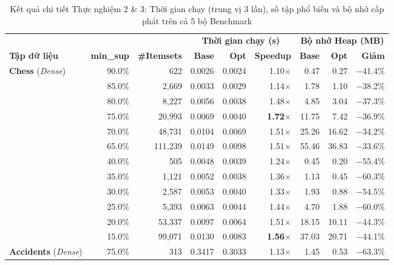 \documentclass[conference]{IEEEtran}
\begin{document}
\begin{table}[t]
\caption{Kết quả chi tiết Thực nghiệm 2 \& 3: Thời gian chạy (trung vị 3 lần), số tập phổ biến và bộ nhớ cấp phát trên cả 5 bộ Benchmark}
\label{tab:exp2_full}
\centering
\scriptsize
\renewcommand{\arraystretch}{0.96}
\setlength{\aboverulesep}{0pt}
\setlength{\belowrulesep}{0pt}
\begin{tabular*}{\textwidth}{@{\extracolsep{\fill}}lrrrrrrrr@{}}
\toprule
& & & \multicolumn{3}{c}{\textbf{Thời gian chạy (s)}} & \multicolumn{3}{c}{\textbf{Bộ nhớ Heap (MB)}} \\
\cmidrule(lr){4-6} \cmidrule(lr){7-9}
\textbf{Tập dữ liệu} & \textbf{min\_sup} & \textbf{\#Itemsets} & \textbf{Base} & \textbf{Opt} & \textbf{Speedup} & \textbf{Base} & \textbf{Opt} & \textbf{Giảm} \\
\midrule
\multirow{6}{*}{\textbf{Chess} (\textit{Dense})}
 & 90.0\% & 622 & 0.0026 & 0.0024 & 1.10$\times$ & 0.47 & 0.27 & $-$41.4\% \\
 & 85.0\% & 2,669 & 0.0033 & 0.0029 & 1.14$\times$ & 1.78 & 1.10 & $-$38.2\% \\
 & 80.0\% & 8,227 & 0.0056 & 0.0038 & 1.48$\times$ & 4.85 & 3.04 & $-$37.3\% \\
 & 75.0\% & 20,993 & 0.0069 & 0.0040 & \textbf{1.72$\times$} & 11.75 & 7.42 & $-$36.9\% \\
 & 70.0\% & 48,731 & 0.0104 & 0.0069 & 1.51$\times$ & 25.26 & 16.62 & $-$34.2\% \\
 & 65.0\% & 111,239 & 0.0149 & 0.0098 & 1.51$\times$ & 55.46 & 36.83 & $-$33.6\% \\
\midrule
\rowcolor{gray!7} & 40.0\% & 505 & 0.0048 & 0.0039 & 1.24$\times$ & 0.45 & 0.20 & $-$55.4\% \\
\rowcolor{gray!7} & 35.0\% & 1,121 & 0.0052 & 0.0038 & 1.36$\times$ & 1.13 & 0.45 & $-$60.3\% \\
\rowcolor{gray!7} & 30.0\% & 2,587 & 0.0053 & 0.0040 & 1.33$\times$ & 1.93 & 0.88 & $-$54.5\% \\
\rowcolor{gray!7} & 25.0\% & 5,393 & 0.0063 & 0.0044 & 1.44$\times$ & 4.70 & 1.88 & $-$60.0\% \\
\rowcolor{gray!7} & 20.0\% & 53,337 & 0.0097 & 0.0064 & 1.51$\times$ & 18.15 & 10.11 & $-$44.3\% \\
\rowcolor{gray!7} \multirow{-6}{*}{\textbf{Mushroom} (\textit{Dense})} & 15.0\% & 99,071 & 0.0130 & 0.0083 & \textbf{1.56$\times$} & 37.03 & 20.71 & $-$44.1\% \\
\midrule
\multirow{6}{*}{\textbf{Accidents} (\textit{Dense})}
 & 75.0\% & 313 & 0.3417 & 0.3033 & 1.13$\times$ & 1.45 & 0.53 & $-$63.3\% \\

\end{tabular*}
\end{table}
\end{document}
